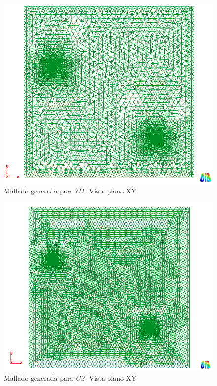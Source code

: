 \documentclass[10pt,a4paper,final]{article}
\begin{document}
\begin{figure}[tbhp]
\centerline{\includegraphics[scale=0.4]{img/100m/100_xy_contorno_malla}}
\caption{Mallado generada para \emph{G1}- Vista plano XY}
\label{100_xy_contorno_malla}
\end{figure}
%
\begin{figure}[tbhp]
\centerline{\includegraphics[scale=0.4]{img/200m/200_xy_contorno_malla}}
\caption{Mallado generada para \emph{G2}- Vista plano XY}
\label{200_xy_contorno_malla}
\end{figure}
%
\end{document}
